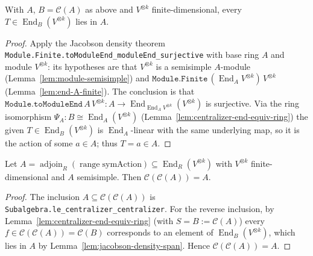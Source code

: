\begin{lemma}
    \label{lem:jacobson-density-span}
    With $A$, $B = \mathcal{C}(A)$ as above and $V^{\otimes k}$ finite-dimensional, every
    $T \in \operatorname{End}_B(V^{\otimes k})$ lies in $A$.
\end{lemma}
\begin{proof}
    Apply the Jacobson density theorem \texttt{Module.Finite.toModuleEnd\_moduleEnd\_surjective} with base
    ring $A$ and module $V^{\otimes k}$: its hypotheses are that $V^{\otimes k}$ is a semisimple $A$-module
    (Lemma~\ref{lem:module-semisimple}) and $\texttt{Module.Finite}\,(\operatorname{End}_A V^{\otimes k})\,
    V^{\otimes k}$ (Lemma~\ref{lem:end-A-finite}). The conclusion is that
    $\texttt{Module.toModuleEnd}\,A\,V^{\otimes k} : A \to \operatorname{End}_{\operatorname{End}_A
    V^{\otimes k}}(V^{\otimes k})$ is surjective. Via the ring isomorphism $\Psi_A : B \cong
    \operatorname{End}_A(V^{\otimes k})$ (Lemma~\ref{lem:centralizer-end-equiv-ring}) the given
    $T \in \operatorname{End}_B(V^{\otimes k})$ is $\operatorname{End}_A$-linear with the same underlying
    map, so it is the action of some $a \in A$; thus $T = a \in A$.
\end{proof}

\begin{lemma}
    \label{lem:double-commutant}
    \leanok
    Let $A = \operatorname{adjoin}_R(\operatorname{range}\mathrm{symAction})
      \subseteq \operatorname{End}_R(V^{\otimes k})$ with $V^{\otimes k}$ finite-dimensional and $A$
    semisimple. Then $\mathcal{C}(\mathcal{C}(A)) = A$.
\end{lemma}
\begin{proof}
    The inclusion $A \subseteq \mathcal{C}(\mathcal{C}(A))$ is
    \texttt{Subalgebra.le\_centralizer\_centralizer}. For the reverse inclusion, by
    Lemma~\ref{lem:centralizer-end-equiv-ring} (with $S = B := \mathcal{C}(A)$) every
    $f \in \mathcal{C}(\mathcal{C}(A)) = \mathcal{C}(B)$ corresponds to an element of
    $\operatorname{End}_B(V^{\otimes k})$, which lies in $A$ by Lemma~\ref{lem:jacobson-density-span}.
    Hence $\mathcal{C}(\mathcal{C}(A)) = A$.
\end{proof}

